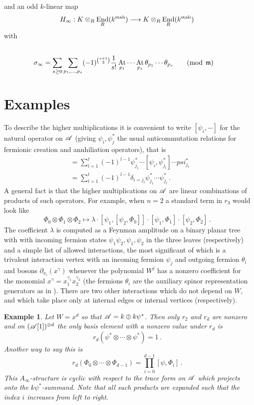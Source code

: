 \documentclass[english,letter paper,12pt,leqno]{article}
\theoremstyle{example}
\newtheorem{example}[theorem]{Example}
\numberwithin{equation}{section}
\def\stab{\operatorname{stab}}
\DeclareMathOperator{\End}{End}
\DeclareMathOperator{\At}{At}
\begin{document}
and an odd $k$-linear map
\[
H_\infty: K \otimes_R \End_R(k^{\stab}) \lto K \otimes_R \End_R(k^{\stab})
\]
with
\begin{align*}
\,\\
\sigma_\infty &= \sum_{s \ge 0} \sum_{p_1,\ldots,p_s} (-1)^{\binom{s+1}{2}} \frac{1}{s!} \At_{p_1} \cdots \At_{p_s} \theta_{p_1} \cdots \theta_{p_s} \qquad (\operatorname{mod}\; \mf{m})
\end{align*}
\newpage


\section{Examples}

To describe the higher multiplications it is convenient to write $[ \psi_i, - ]$ for the natural operator on $\mathscr{A}$ (giving $\psi_i, \psi_j^*$ the usual anticommutation relations for fermionic creation and annhiliation operators), that is
\begin{align*}
[ \psi_i, \psi_{j_1}^* \cdots \psi_{j_t}^* ] &= \sum_{l=1}^t (-1)^{l-1} \psi_{j_1}^* \cdots [\psi_i, \psi_{j_l}^* ] \cdots psi_{j_t}^*\\
&= \sum_{l=1}^t (-1)^{l-1} \delta_{i=j_l} \psi_{j_1}^* \cdots \psi_{j_t}^*\,.
\end{align*}
A general fact is that the higher multiplications on $\mathscr{A}$ are linear combinations of products of such operators. For example, when $n = 2$ a standard term in $r_3$ would look like
\[
\Phi_0 \otimes \Phi_1 \otimes \Phi_2 \mapsto \lambda \cdot [ \psi_1, [ \psi_2, \Phi_0 ] ] \cdot [ \psi_1, \Phi_1 ] \cdot [ \psi_2, \Phi_2 ]\,.
\]
The coefficient $\lambda$ is computed as a Feynman amplitude on a binary planar tree with with incoming fermion states $\psi_1 \psi_2, \psi_1, \psi_2$ in the three leaves (respectively) and a simple list of allowed interactions, the most significant of which is a trivalent interaction vertex with an incoming fermion $\psi_j$ and outgoing fermion $\theta_i$ and bosons $\partial_{x_i}( x^\gamma )$ whenever the polynomial $W^j$ has a nonzero coefficient for the monomial $x^\gamma = x_1^{\gamma_1} x_2^{\gamma_2}$ (the fermions $\theta_i$ are the auxiliary spinor representation generators as in \cite{murfet}). There are two other interactions which do not depend on $W$, and which take place only at internal edges or internal vertices (respectively).

\begin{example} Let $W = x^d$ so that $\mathscr{A} = k \oplus k \psi^*$. Then only $r_2$ and $r_d$ are nonzero and on $(\mathscr{A}[1])^{\otimes d}$ the only basis element with a nonzero value under $r_d$ is
\[
r_d( \psi^* \otimes \cdots \otimes \psi^* ) = 1\,.
\]
Another way to say this is
\[
r_d( \Phi_0 \otimes \cdots \otimes \Phi_{d-1} ) = \prod_{i=0}^{d-1} [ \psi, \Phi_i ]\,.
\]
This $A_\infty$-structure is cyclic with respect to the trace form on $\mathscr{A}$ which projects onto the $k \psi^*$-summand. Note that all such products are expanded such that the index $i$ increases from left to right.
\end{example}
\end{document}
